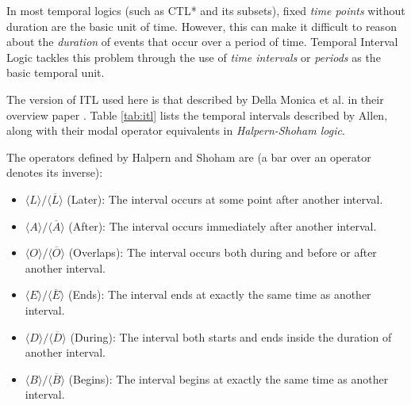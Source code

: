 \documentclass{llncs}
\begin{document}
In most temporal logics (such as CTL* and its subsets), fixed \emph{time points} without duration are the basic unit of time. However, this can make it difficult to reason about the \emph{duration} of events that occur over a period of time. Temporal Interval Logic tackles this problem through the use of \emph{time intervals} or \emph{periods} as the basic temporal unit.

The version of ITL used here is that described by Della Monica et al. in their overview paper \cite{della2013interval}. Table \ref{tab:itl} lists the temporal intervals described by Allen, along with their modal operator equivalents in \emph{Halpern-Shoham logic}.

The operators defined by Halpern and Shoham are (a bar over an operator denotes its inverse):

\begin{itemize}
\item $\langle L \rangle / \langle \overline{L} \rangle$ (Later): The interval occurs at some point after another interval.
\item $\langle A \rangle / \langle \overline{A} \rangle$ (After): The interval occurs immediately after another interval.
\item $\langle O \rangle / \langle \overline{O} \rangle$ (Overlaps): The interval occurs both during and before or after another interval.
\item $\langle E \rangle / \langle \overline{E} \rangle$ (Ends): The interval ends at exactly the same time as another interval.
\item $\langle D \rangle / \langle \overline{D} \rangle$ (During): The interval both starts and ends inside the duration of another interval.
\item $\langle B \rangle / \langle \overline{B} \rangle$ (Begins): The interval begins at exactly the same time as another interval.
\end{itemize}
\end{document}
